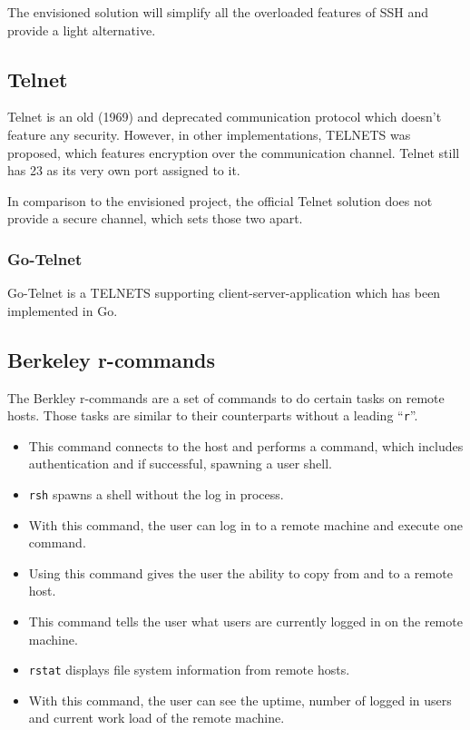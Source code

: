\documentclass[10pt,a4paper,titlepage,twoside,english,final]{zhawreprt}
\begin{document}
The envisioned solution will simplify all the overloaded features of \gls{SSH} and provide a light alternative.

\subsection{Telnet}\label{ssec:Telnet}
Telnet\citep{rfc15,rfc854} is an old (1969) and deprecated communication protocol which doesn't feature any security.
However, in other implementations, \gls{TELNETS} was proposed, which features encryption over the communication channel.
Telnet still has 23 as its very own \gls{port} assigned to it.

In comparison to the envisioned project, the official Telnet solution does not provide a secure channel, which sets those two apart.

\subsubsection{Go-Telnet}
Go-Telnet\citep{gotelnet} is a \gls{TELNETS} supporting client-server-application which has been implemented in \gls{Go}.

\subsection{Berkeley r-commands}\label{ssec:BerkeleyRCommands}
The Berkley r-commands are a set of commands to do certain tasks on remote hosts.
Those tasks are similar to their counterparts without a leading ``\texttt{r}''.
\begin{itemize}
\item \cite{rlogin}

This command connects to the host and performs a \cite{login} command, which includes authentication and if successful, spawning a user \gls{shell}.

\item \cite{rsh}

\texttt{rsh} spawns a \gls{shell} without the log in process.

\item \cite{rexec}

With this command, the user can log in to a remote machine and execute one command.

\item \cite{rcp}

Using this command gives the user the ability to copy from and to a remote host.

\item \cite{rwho}

This command tells the user what users are currently logged in on the remote machine.

\item \cite{rstat}

\texttt{rstat} displays file system information from remote hosts.

\item \cite{ruptime}

With this command, the user can see the \gls{uptime}, number of logged in users and current work load of the remote machine.
\end{itemize}
\end{document}
